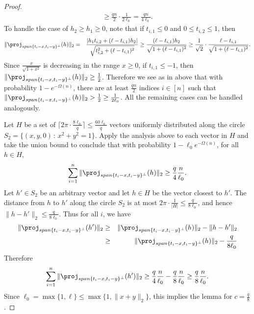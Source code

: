 \begin{proof}
\begin{eqnarray*}
	\ge \frac{qn}{2} \cdot \frac{1}{2\ell_0}
	= \frac{qn}{4\ell_{0}}.
\end{eqnarray*}
To handle the case of $h_2 \geq h_1 \geq 0$, note that if $t_{i,1} \le 0$ and $0 \le t_{i,2} \le 1$, then
\begin{eqnarray*}
	\|\proj_{span\{t_{i}-x,t_{i}-y\}^{\perp}}(h)\|_2
	& = & \frac{\left|h_{1}t_{i,2}+(\ell-t_{i,1})h_{2}\right|}{\sqrt{t_{i,2}^{2}+(\ell-t_{i,1})^{2}}}
	\ge \frac{(\ell-t_{i,1})h_{2}}{\sqrt{1+(\ell-t_{i,1})^{2}}}
	\ge \frac{1}{\sqrt{2}} \cdot \frac{\ell-t_{i,1}}{\sqrt{1+(\ell-t_{i,1})^{2}}}.
\end{eqnarray*}
Since $\frac{x}{\sqrt{1+x^2}}$ is decreasing in the range $x \ge 0$, 
if $t_{i,1} \le -1$, then $\|\proj_{span\{t_{i}-x,t_{i}-y\}^{\perp}}(h)\|_2 \ge \frac{1}{2}$. 
Therefore we see as in above that with probability $1-e^{-\Omega(n)}$, there are at least $\frac{qn}{2}$ indices 
$i \in [n]$ such that $\|\proj_{span\{t_{i}-x,t_{i}-y\}^{\perp}}(h)\|_2>\frac{1}{2} \ge \frac{1}{2\ell_0}$.
All the remaining cases can be handled analogously.

Let $H$ be a set of $\lceil 2\pi \cdot \frac{8\ell_{0}}{q} \rceil \le \frac{60\ell_0}{q}$
vectors uniformly distributed along the circle $S_2 = \{(x,y,0) \,:\, x^2 + y^2 = 1\}$. 
Apply the analysis above to
each vector in $H$ and take the union bound to conclude that with
probability $1-\ell_{0}e^{-\Omega(n)}$, for all $h\in H$,
\[
\sum_{i=1}^{n}\|\proj_{span\{t_{i}-x,t_{i}-y\}^{\perp}}(h)\|_2\ge\frac{q}{4}\frac{n}{\ell_{0}}.
\]
Let $h' \in S_2$ be an arbitrary vector and
let $h \in H$ be the vector closest to $h'$. The distance from $h$ to $h'$ along the circle $S_2$ is at most 
$2\pi \cdot \frac{1}{|H|} \le \frac{q}{8\ell_0}$, and hence $\|h - h'\|_2 \le \frac{q}{8\ell_0}$. 
Thus for all $i$, we have 
\begin{eqnarray*}
\|\proj_{span\{t_{i}-x,t_{i}-y\}^{\perp}}(h')\|_2 & \ge & \|\proj_{span\{t_{i}-x,t_{i}-y\}^{\perp}}(h)\|_2-\|h-h'\|_2\\
 & \ge & \|\proj_{span\{t_{i}-x,t_{i}-y\}^{\perp}}(h)\|_2-\frac{q}{8\ell_{0}}
\end{eqnarray*}
Therefore 
\[
\sum_{i=1}^{n}\|\proj_{span\{t_{i}-x,t_{i}-y\}^{\perp}}(h')\|_2\ge\frac{q}{4}\frac{n}{\ell_{0}}-\frac{q}{8}\frac{n}{\ell_{0}}\ge\frac{q}{8}\frac{n}{\ell_{0}}.
\]
Since $\ell_{0}=\max\{1,\ell\}\le\max\{1,\|x+y\|_2\}$, this implies
the lemma for $c=\frac{q}{8}$.
\end{proof}


